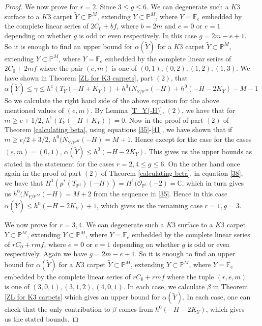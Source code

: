 \documentclass[11pt,twoside]{amsart}
\theoremstyle{plain}
\numberwithin{equation}{section}
\theoremstyle{definition}
\begin{document}
\begin{proof}
We now prove for $r = 2$. Since $3 \leq g \leq 6$. We can degenerate such a $K3$ surface to a $K3$ carpet $\widetilde{Y} \subset \mathbb{P}^M$, extending $Y \subset \mathbb{P}^M$, where $Y = \mathbb{F}_e$ embedded by the complete linear series of $2C_0+bf$, where $b = 2m$ and $e = 0$ or $e = 1$ depending on whether $g$ is odd or even respectively. In this case $g = 2m-e+1$. So it is enough to find an upper bound for $\alpha(\widetilde{Y})$ for a $K3$ carpet $\widetilde{Y} \subset \mathbb{P}^M$, extending $Y \subset \mathbb{P}^M$, where $Y = \mathbb{F}_e$ embedded by the complete linear series of $2C_0+2mf$ where the pair $(e,m)$ is one of $(0,1), (0,2), (1,2), (1,3)$. We have shown in Theorem \ref{ZL for K3 carpets}, part $(2)$, that $$\alpha(\widetilde{Y})  \leq  \gamma \leq h^1(T_Y(-H+K_Y))+h^0(N_{Y/\mathbb{P}^M}(-H)+h^0(-H-2K_Y)-M-1 $$
So we calculate the right hand side of the above equation for the above mentioned values of $(e,m)$. By Lemma \ref{T_Y(-H)}, $(2)$, we have that for $m \geq e+1/2$, $h^1(T_Y(-H+K_Y)) = 0$. Now in the proof of part $(2)$ of Theorem \ref{calculating beta}, using equations \ref{35}-\ref{41}, we have shown that if $m \geq e/2+3/2$, $h^0(N_{Y/\mathbb{P}^M}(-H) = M+1$. Hence except for the case for the cases $(e,m) = (0,1)$, $\alpha(\widetilde{Y}) \leq h^0(-H-2K_Y)$. This gives us the upper bounds as stated in the statement for the cases $r = 2, 4 \leq g \leq 6$. On the other hand once again in the proof of part $(2)$ of Theorem \ref{calculating beta}, in equation \ref{38}, we have that $H^1(p^*(T_{\mathbb{P}^1})(-H)) = H^1(\mathcal{O}_{\mathbb{P}^1}(-2) = \mathbb{C}$, which in turn gives us $h^0(N_{Y/\mathbb{P}^M}(-H) = M+2$ from the sequence in \ref{35}. Hence in this case $\alpha(\widetilde{Y}) \leq h^0(-H-2K_Y)+1$, which gives us the remaining case $r = 1, g = 3$. \par

We now prove for $r = 3,4$. We can degenerate such a $K3$ surface to a $K3$ carpet $\widetilde{Y} \subset \mathbb{P}^M$, extending $Y \subset \mathbb{P}^M$, where $Y = \mathbb{F}_e$ embedded by the complete linear series of $rC_0+rmf$, where $e = 0$ or $e = 1$ depending on whether $g$ is odd or even respectively. Again we have $g = 2m-e+1$. So it is enough to find an upper bound for $\alpha(\widetilde{Y})$ for a $K3$ carpet $\widetilde{Y} \subset \mathbb{P}^M$, extending $Y \subset \mathbb{P}^M$, where $Y = \mathbb{F}_e$ embedded by the complete linear series of $rC_0+rmf$ where the tuple $(r,e,m)$ is one of $(3,0,1), (3,1,2), (4,0,1)$. In each case, we calculate $\beta$ in Theorem \ref{ZL for K3 carpets} which gives an upper bound for $\alpha(\widetilde{Y})$. In each case, one can check that the only contribution to $\beta$ comes from $h^0(-H-2K_Y)$, which gives us the stated bounds.
\end{proof}
\end{document}
